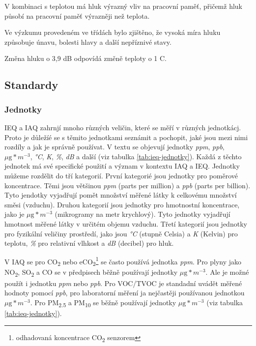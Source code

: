 V kombinaci s teplotou má hluk výrazný vliv na pracovní paměť, přičemž hluk působí na pracovní paměť výrazněji než teplota. \parencite{dengImpactIndoorAir2024} 

Ve výzkumu provedeném ve třídách bylo zjištěno, že vysoká míra hluku způsobuje únavu, bolesti hlavy a další nepříznivé stavy. \parencite{dengImpactIndoorAir2024}

Změna hluku o 3,9 dB odpovídá změně teploty o 1 \textdegree C. \parencite{dengImpactIndoorAir2024}


\subsection{Standardy}

\subsubsection{Jednotky}
IEQ a IAQ zahrnjí mnoho různých veličin, které se měří v různých jednotkácj. Proto je důležíé se s těmito jednotkami seznámit a pochopit, jaké jsou mezi nimi rozdíly a jak je správně používat.
V textu se objevují jednotky \textit{ppm}, \textit{ppb}, \textit{$\mu\text{g}*m^{-3}$}, \textit{°C}, \textit{K}, \textit{\%}, \textit{dB} a další (viz tabulka \ref{tab:ieq-jednotky}). Každá z těchto jednotek má své specifické použití a význam v kontextu IAQ a IEQ.\parencite{dengImpactIndoorAir2024}
Jednotky můžeme rozdělit do tří kategorií. První kategorié jsou jednotky pro poměrové koncentrace. Těmi jsou většinou \textit{ppm} (parts per million) a \textit{ppb} (parts per billion). Tyto jendotky vyjadřují pomět množství měřené látky k celkovému množství směsi (vzduchu). Druhou kategorií jsou jednotky pro hmotnostní koncentrace, jako je \textit{$\mu\text{g}*m^{-3}$} (mikrogramy na metr krychlový). Tyto jednotky vyjadřují hmotnost měřené látky v určitém objemu vzduchu. Třetí kategorií jsou jednotky pro fyzikální veličiny prostředí, jako jsou \textit{°C} (stupně Celsia) a \textit{K} (Kelvin) pro teplotu, \textit{\%} pro relativní vlhkost a \textit{dB} (decibel) pro hluk.\parencite{worldhealthorganizationWHOGlobalAir2021} 

V IAQ se pro CO\textsubscript{2} nebo eCO\textsubscript{2}\footnote{odhadovaná koncentrace CO\textsubscript{2} senzorem\parencite{calvoScalableIoTArchitecture2022}} se často používá jednotka \textit{ppm}. Pro plyny jako NO\textsubscript{2}, SO\textsubscript{2} a CO se v předpisech běžně používají jednotky \textit{$\mu\text{g}*m^{-3}$}. Ale je možné použít i jednotku \textit{ppm} nebo \textit{ppb}. Pro VOC/TVOC je standadní uvádět měřené hodnoty pomocí \textit{ppb}, pro laboratorní měření ja nejčastěji používanou jednotkou \textit{$\mu\text{g}*m^{-3}$}. Pro PM\textsubscript{2.5} a PM\textsubscript{10} se běžně používají jednotky \textit{$\mu\text{g}*m^{-3}$} (viz tabulka \ref{tab:ieq-jednotky}).\parencite{calvoScalableIoTArchitecture2022,osephg.allenAssociationsCognitiveFunction2016,worldhealthorganizationWHOGlobalAir2021}


